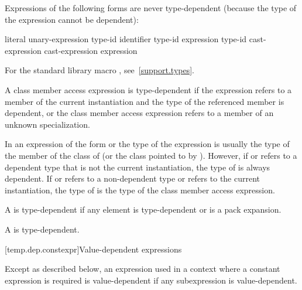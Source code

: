 \pnum
Expressions of the following forms are never type-dependent (because the type
of the expression cannot be dependent):

\begin{ncsimplebnf}
literal\br
{} unary-expression\br
{} \terminal{(} type-id \terminal{)}\br
{}  \terminal{(} identifier \terminal{)}\br
{} \terminal{(} type-id \terminal{)}\br
{} \terminal{(} expression \terminal{)}\br
{} \terminal{(} type-id \terminal{)}\br
\opt{\terminal{::}}  cast-expression\br
\opt{\terminal{::}}  \terminal{[} \terminal{]} cast-expression\br
{} \br
{} \terminal{(} expression \terminal{)}
\end{ncsimplebnf}

\begin{note}
For the standard library macro ,
see~\ref{support.types}.
\end{note}

\pnum
A class member access expression is
type-dependent if
the expression refers to a member of the current instantiation and
the type of the referenced member is dependent, or the class member access
expression refers to a member of an unknown specialization.
\begin{note}
In an expression of the form
or
the type of the expression is usually the type of the member
of the class of
(or the class pointed to by
).
However, if
or
refers to a dependent type that is not the current instantiation,
the type of
is always dependent. If
or 
refers to a non-dependent type or refers to the current instantiation, the
type of
is the type of the class member access expression.
\end{note}

\pnum
A  is type-dependent if any element is
type-dependent or is a pack expansion.

\pnum
A  is type-dependent.

[temp.dep.constexpr]{Value-dependent expressions}

\pnum
Except as described below, an expression used in a context where a
constant expression is required is value-dependent if any
subexpression is value-dependent.

